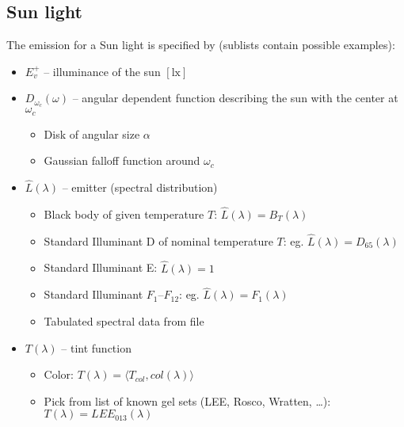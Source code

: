 
\subsection{Sun light}

The emission for a Sun light is specified by (sublists contain possible examples):

\begin{itemize}
\item $E^+_v$ -- illuminance of the sun $[\si{\lux}]$
\item $D_{\omega_c}(\omega)$ -- angular dependent function describing the sun with the center at $\omega_c$
	\begin{itemize} \small\it
	\item Disk of angular size $\alpha$
	\item Gaussian falloff function around $\omega_c$
	\end{itemize}
\item $\hat{L}(\lambda)$ -- emitter (spectral distribution)
  \begin{itemize}\small\it
  \item Black body of given temperature $T$: $\hat L(\lambda) = B_T(\lambda)$
  \item Standard Illuminant D of nominal temperature $T$: eg. $\hat L(\lambda) = D_{65}(\lambda)$
  \item Standard Illuminant E: $\hat L(\lambda) = 1$
  \item Standard Illuminant $F_1$--$F_{12}$: eg. $\hat L(\lambda) = F_1(\lambda)$
  \item Tabulated spectral data from file
  \end{itemize}
\item $T(\lambda)$ -- tint function
  \begin{itemize}\small\it
  \item Color: $T(\lambda) = \langle T_{col}, col(\lambda) \rangle$
  \item Pick from list of known gel sets (LEE, Rosco, Wratten, \ldots): $T(\lambda) = LEE_{013} (\lambda)$
  \end{itemize}
\end{itemize}

